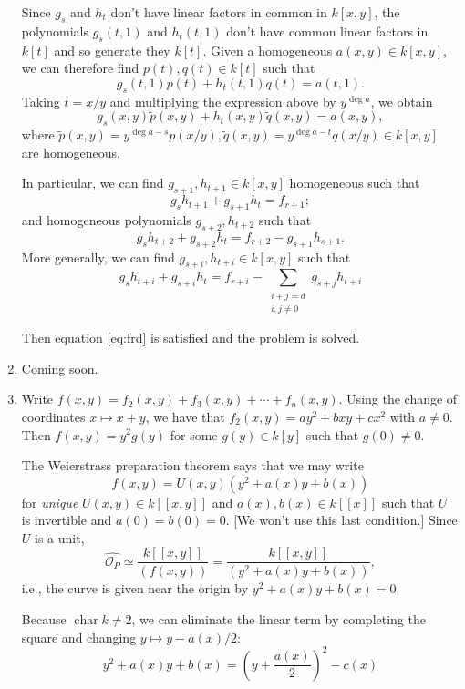 \begin{enumerate}[label=(\alph*)]
	Since $g_s$ and $h_t$ don't have linear factors in common in $k[x,y]$, the polynomials $g_s(t,1)$ and $h_t(t,1)$ don't have common linear factors in $k[t]$ and so generate they $k[t]$.
	Given a homogeneous $a(x,y) \in k[x,y]$, we can therefore find $p(t), q(t) \in k[t]$ such that
	\[ g_s(t,1)p(t) + h_t(t,1)q(t) = a(t,1). \]
	Taking $t = x/y$ and multiplying the expression above by $y^{\deg a}$, we obtain
	\[ g_s(x,y)\tilde{p}(x,y) + h_t(x,y)\tilde{q}(x,y) = a(x,y), \]
	where $\tilde{p}(x,y) = y^{\deg a -s}p(x/y), \tilde{q}(x,y) = y^{\deg a - t}q(x/y)  \in k[x,y]$ are homogeneous.
	
	In particular, we can find $g_{s+1}, h_{t+1} \in k[x,y]$ homogeneous such that
	\[ g_sh_{t+1} + g_{s+1}h_t = f_{r+1}; \]
	and homogeneous polynomials $g_{s+2}, h_{t+2}$ such that
	\[ g_sh_{t+2} + g_{s+2}h_t = f_{r+2} - g_{s+1}h_{s+1}. \]
	More generally, we can find $g_{s+i}, h_{t+i} \in k[x,y]$ such that
	\[ g_sh_{t+i} + g_{s+i}h_t = f_{r+i} - \sum_{\substack{i+j=d\\ i,j \ne 0}} g_{s+j}h_{t+i} \]
	
	Then equation \eqref{eq:frd} is satisfied and the problem is solved.
	
	
	\item Coming soon.
	
	\item Write $f(x,y) = f_2(x,y) + f_3(x,y) + \cdots + f_n(x,y)$.
	Using the change of coordinates $x \mapsto x+y$, we have that $f_2(x,y) = ay^2 + bxy + cx^2$ with $a \ne 0$.
	Then $f(x,y) = y^2 g(y)$ for some $g(y) \in k[y]$ such that $g(0) \ne 0$.
	
	The Weierstrass preparation theorem says that we may write
	\[ f(x,y) = U(x,y)(y^2 + a(x)y + b(x)) \]
	for \emph{unique} $U(x,y) \in k[[x,y]]$ and $a(x), b(x) \in k[[x]]$ such that $U$ is invertible and $a(0)=b(0)=0$. [We won't use this last condition.]
	Since $U$ is a unit,
	\[ \widehat{\mathcal{O}_P} \simeq \frac{k[[x,y]]}{(f(x,y))} = \frac{k[[x,y]]}{(y^2 + a(x)y + b(x))}, \]
	i.e., the curve is given near the origin by $y^2 + a(x)y + b(x) = 0$.
	
	Because $\operatorname{char} k \ne 2$, we can eliminate the linear term by completing the square and changing $y \mapsto y - a(x)/2$:
	\[ y^2 + a(x)y + b(x) = \left( y + \frac{a(x)}{2} \right)^2 - c(x) \]
	

\end{enumerate}

